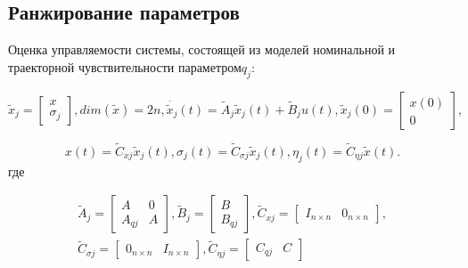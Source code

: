 \subsection{Ранжирование параметров}

Оценка управляемости системы, состоящей из моделей номинальной и траекторной чувствительности параметром$ q_{j} $:

\begin{equation}
\tilde{x}_j=
\begin{bmatrix}
x \\ \sigma_j
\end{bmatrix}, dim(\tilde{x})=2n, \dot{\tilde{x}_j}(t)=\tilde{A}_j\tilde{x}_j(t)+\tilde{B}_j u(t), \tilde{x}_j(0)=
\begin{bmatrix}
x(0)\\0
\end{bmatrix}, 
\end{equation}

\begin{equation}
x(t)=\tilde{C}_{xj}\tilde{x}_j(t), \sigma_j(t)=\tilde{C}_{\sigma j}\tilde{x}_j(t), \eta_j(t)=\tilde{C}_{\eta j}\tilde{x}(t).
\end{equation}
где

\begin{align*}
\tilde{A}_j=
\begin{bmatrix}
A&0\\
A_{qj}&A
\end{bmatrix},
\tilde{B}_j=
\begin{bmatrix}
B\\B_{qj}
\end{bmatrix},
\tilde{C}_{xj}=
\begin{bmatrix}
I_{n\times n}&0_{n\times n}
\end{bmatrix},\\
\tilde{C}_{\sigma j}=
\begin{bmatrix}
0_{n\times n}&I_{n\times n}
\end{bmatrix},
\tilde{C}_{\eta j}=
\begin{bmatrix}
C_{qj} & C
\end{bmatrix}
\end{align*}

